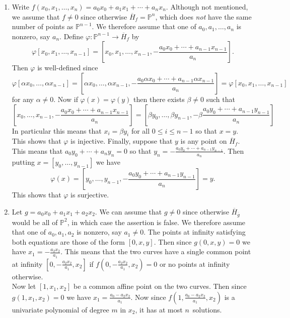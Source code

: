 \documentclass[12pt]{article}
\begin{document}
\begin{enumerate}
\item %
Write $f\left(x_0,x_1,\ldots,x_n\right)
=a_0x_0+a_1x_1+\cdots+a_nx_n$.
Although not mentioned, we assume that $f\ne 0$
since otherwise $\overline{H}_f=\mathbb{P}^n$,
which does {\em not} have the same number of points
as $\mathbb{P}^{n-1}$. We therefore assume that one of
$a_0,a_1,\ldots,a_n$ is nonzero, say $a_n$. Define
$\varphi:\mathbb{P}^{n-1}\to\overline{H}_f$ by
\[\varphi\left[x_0,x_1,\ldots,x_{n-1}\right]
=\left[x_0,x_1,\ldots,x_{n-1},-\frac{a_0x_0+\cdots+a_{n-1}x_{n-1}}{a_n}
\right].\]
Then $\varphi$ is well-defined since
\[\varphi\left[\alpha x_0,\ldots,\alpha x_{n-1}\right]
=\left[\alpha x_0,\ldots,\alpha x_{n-1},
-\frac{a_0\alpha x_0+\cdots+a_{n-1}\alpha x_{n-1}}{a_n}\right]
=\varphi\left[x_0,x_1,\ldots,x_{n-1}\right]\]
for any $\alpha\ne 0$.
Now if $\varphi\left(x\right)=\varphi\left(y\right)$
then there exists $\beta\ne 0$ such that
\[\left[x_0,\ldots,x_{n-1},-\frac{a_0x_0
+\cdots+a_{n-1}x_{n-1}}{a_n}\right]
=\left[\beta y_0,\ldots,\beta y_{n-1},-\beta\frac{a_0y_0
+\cdots+a_{n-1}y_{n-1}}{a_n}\right]\]
In particular this means that $x_i=\beta y_i$
for all $0\le i\le n-1$ so that $x=y$.
This shows that $\varphi$ is injective.
Finally, suppose that $y$ is any point on $\overline{H}_f$.
This means that $a_0y_0+\cdots+a_ny_n=0$
so that $y_n=-\frac{a_0y_0+\cdots+a_{n-1}y_{n-1}}{a_n}$.
Then putting $x=\left[y_0,\ldots,y_{n-1}\right]$ we have
\[\varphi\left(x\right)
=\left[y_0,\ldots,y_{n-1},-\frac{a_0y_0+\cdots+a_{n-1}y_{n-1}}{a_n}
\right]=y.\]
This shows that $\varphi$ is surjective.

\item %
Let $g=a_0x_0+a_1x_1+a_2x_2$. We can assume that
$g\ne 0$ since otherwise $\overline{H}_{\overline{g}}$
would be all of $\mathbb{P}^2$,
in which case the assertion is false.
We therefore assume that one of $a_0,a_1,a_2$ is nonzero,
say $a_1\ne 0$. The points at infinity satisfying
both equations are those of the form $\left[0,x,y\right]$.
Then since $g\left(0,x,y\right)=0$ we have
$x_1=-\frac{a_2x_2}{a_1}$. This means that the two curves
have a single common point at infinity
$\left[0,-\frac{a_2x_2}{a_1},x_2\right]$ if
$f\left(0,-\frac{a_2x_2}{a_1},x_2\right)=0$
or no points at infinity otherwise.
\\
Now let $\left[1,x_1,x_2\right]$ be a common affine point
on the two curves. Then since $g\left(1,x_1,x_2\right)=0$
we have $x_1=\frac{a_0-a_2x_2}{a_1}$. Now since
$f\left(1,\frac{a_0-a_2x_2}{a_1},x_2\right)$ is a univariate
polynomial of degree $m$ in $x_2$, it has at most
$n$~solutions.


\end{enumerate}
\end{document}
